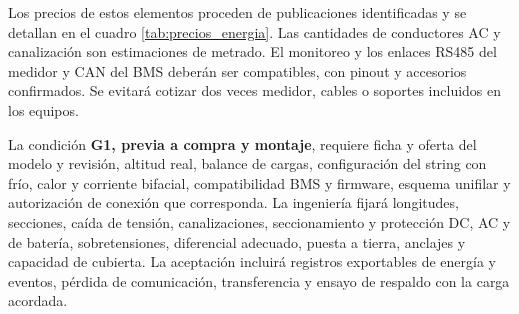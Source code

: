 Los precios de estos elementos proceden de publicaciones identificadas y se detallan en el cuadro \ref{tab:precios_energia}. Las cantidades de conductores AC y canalización son estimaciones de metrado. El monitoreo y los enlaces RS485 del medidor y CAN del BMS deberán ser compatibles, con pinout y accesorios confirmados. Se evitará cotizar dos veces medidor, cables o soportes incluidos en los equipos.

La condición \textbf{G1, previa a compra y montaje}, requiere ficha y oferta del modelo y revisión, altitud real, balance de cargas, configuración del string con frío, calor y corriente bifacial, compatibilidad BMS y firmware, esquema unifilar y autorización de conexión que corresponda. La ingeniería fijará longitudes, secciones, caída de tensión, canalizaciones, seccionamiento y protección DC, AC y de batería, sobretensiones, diferencial adecuado, puesta a tierra, anclajes y capacidad de cubierta. La aceptación incluirá registros exportables de energía y eventos, pérdida de comunicación, transferencia y ensayo de respaldo con la carga acordada.
